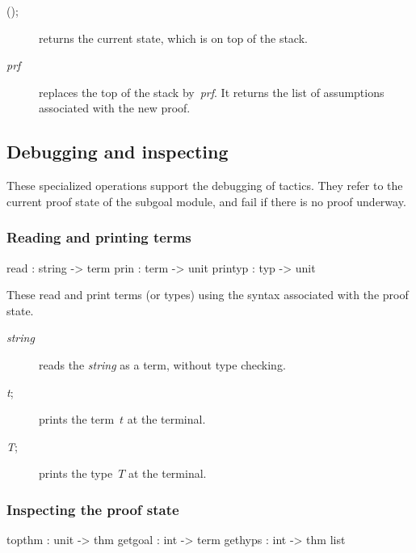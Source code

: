 \begin{description}
\item[();]  
returns the current state, which is on top of the stack.

\item[ {\it prf}]  
replaces the top of the stack by~{\it prf}.  It returns the list of
assumptions associated with the new proof.
\end{description}


\subsection{Debugging and inspecting}
These specialized operations support the debugging of tactics.  They refer
to the current proof state of the subgoal module, and fail if there is no
proof underway.

\subsubsection{Reading and printing terms}
\begin{ttbox} 
read    : string -> term
prin    : term -> unit
printyp : typ -> unit
\end{ttbox}
These read and print terms (or types) using the syntax associated with the
proof state.

\begin{description}
\item[ {\it string}]  
reads the {\it string} as a term, without type checking.

\item[ {\it t};]  
prints the term~$t$ at the terminal.

\item[ {\it T};]  
prints the type~$T$ at the terminal.
\end{description}

\subsubsection{Inspecting the proof state}
\begin{ttbox} 
topthm  : unit -> thm
getgoal : int -> term
gethyps : int -> thm list
\end{ttbox}

